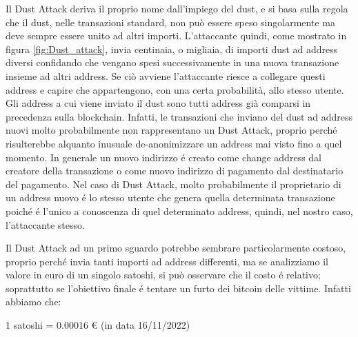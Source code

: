 Il Dust Attack deriva il proprio nome dall'impiego del dust, e si basa sulla regola che il dust, nelle transazioni standard, non può essere speso singolarmente ma deve sempre essere unito ad altri importi. L'attaccante quindi, come mostrato in figura \ref{fig:Dust_attack}, invia centinaia, o migliaia, di importi dust ad address diversi confidando che vengano spesi successivamente in una nuova transazione insieme ad altri address. Se ciò avviene l'attaccante riesce a collegare questi address e capire che appartengono, con una certa probabilità, allo stesso utente. Gli address a cui viene inviato il dust sono tutti address già comparsi in precedenza sulla blockchain. Infatti, le transazioni che inviano del dust ad address nuovi molto probabilmente non rappresentano un Dust Attack, proprio perché risulterebbe alquanto inusuale de-anonimizzare un address mai visto fino a quel momento. In generale un nuovo indirizzo é creato come change address dal creatore della transazione o come nuovo indirizzo di pagamento dal destinatario del pagamento. Nel caso di Dust Attack, molto probabilmente il proprietario di un address nuovo é lo stesso utente che genera quella determinata transazione poiché é l'unico a conoscenza di quel determinato address, quindi, nel nostro caso, l'attaccante stesso.

Il Dust Attack ad un primo sguardo potrebbe sembrare particolarmente costoso, proprio perché invia tanti importi ad address differenti, ma se analizziamo il valore in euro di un singolo satoshi, si può osservare che il costo é relativo; soprattutto se l'obiettivo finale é tentare un furto dei bitcoin delle vittime. Infatti abbiamo che:
\begin{center}
    1 satoshi = 0.00016 € (in data 16/11/2022) 
\end{center}

